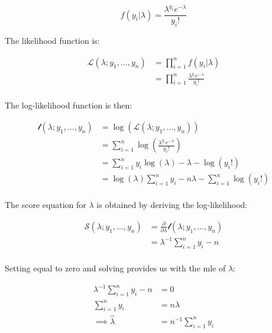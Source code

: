 \documentclass{report}
\begin{document}
\begin{equation}\label{eq:ex-glm-mle-poisson-dist}
    f(y_i|\lambda) = \frac{\lambda^{y_i}e^{-\lambda}}{y_i!}
\end{equation}

The likelihood function is:

\begin{equation}\label{eq:ex-glm-mle-poisson-likelihood}
    \begin{aligned}
        \mathcal{L}(\lambda;y_1, \dots, y_n) 
          &= \prod_{i=1}^n f(y_i|\lambda) \\
          &= \prod_{i=1}^n \frac{\lambda^{y_i}e^{-\lambda}}{y_i!} \\
    \end{aligned}
\end{equation}

The log-likelihood function is then:

\begin{equation}\label{eq:ex-glm-mle-poisson-loglik}
    \begin{aligned}
        \mathcal{l}(\lambda;y_1, \dots, y_n) 
          &= \log\left(\mathcal{L}(\lambda;y_1, \dots, y_n)\right) \\
          &= \sum_{i=1}^n \log\left(\frac{\lambda^{y_i}e^{-\lambda}}{y_i!}\right) \\
          &= \sum_{i=1}^n y_i\log(\lambda) - \lambda - \log(y_i!) \\
          &= \log(\lambda)\sum_{i=1}^n y_i -n\lambda - \sum_{i=1}^n \log(y_i!) \\
    \end{aligned}
\end{equation}

The score equation for $\lambda$ is obtained by deriving the log-likelihood:

\begin{equation}\label{eq:ex-glm-mle-poisson-score-equation}
    \begin{aligned}
        \mathcal{S}(\lambda; y_1, \dots, y_n)
          &= \frac{\partial}{\partial\lambda} \mathcal{l}(\lambda;y_1, \dots, y_n) \\
          &= \lambda^{-1}\sum_{i=1}^n y_i - n \\
    \end{aligned}
\end{equation}

Setting equal to zero and solving provides us with the \gls{mle} of $\lambda$:

\begin{equation}\label{eq:ex-glm-mle-poisson-lambda-mle}
    \begin{aligned}
        \lambda^{-1}\sum_{i=1}^n y_i - n &= 0 \\
        \sum_{i=1}^n y_i &= n\lambda \\
        \implies \hat{\lambda} &= n^{-1}\sum_{i=1}^n y_i \\
    \end{aligned}
\end{equation}
\end{document}
